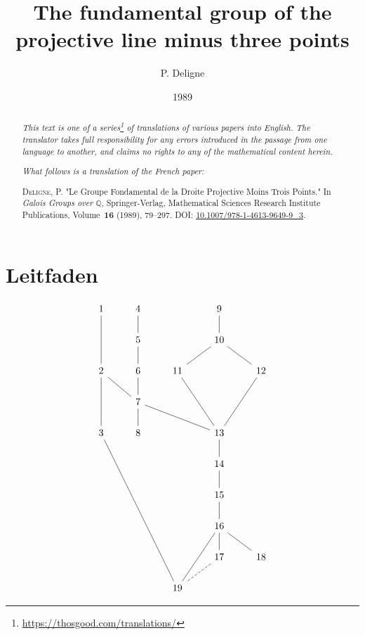 \documentclass{article}
\title{The fundamental group of the projective line minus three points}
\author{P. Deligne}
\date{1989}
\theoremstyle{definition}
\begin{document}
\maketitle
\thispagestyle{fancy}

\renewcommand{\abstractname}{Translator's note.}

\begin{abstract}
  \renewcommand*{\thefootnote}{\fnsymbol{footnote}}
  \emph{This text is one of a series\footnote{\url{https://thosgood.com/translations/}} of translations of various papers into English.}
  \emph{The translator takes full responsibility for any errors introduced in the passage from one language to another, and claims no rights to any of the mathematical content herein.}

  \medskip
  
  \emph{What follows is a translation of the French paper:}

  \medskip\noindent
  \textsc{Deligne, P.}
  "Le Groupe Fondamental de la Droite Projective Moins Trois Points."
  In \emph{Galois Groups over $\mathbb{Q}$}, Springer-Verlag, Mathematical Sciences Research Institute Publications, Volume~\textbf{16} (1989), 79--297.
  \textsc{DOI:} \href{https://doi.org/10.1007/978-1-4613-9649-9_3}{10.1007/978-1-4613-9649-9\_3}.
\end{abstract}

\setcounter{footnote}{0}

\tableofcontents
\bigskip




\section*{Leitfaden}
\[
  \begin{tikzcd}
    1 \ar[dd, no head] & 4 \ar[d, no head] & & 9 \ar[d, no head] &
  \\& 5 \ar[d, no head] & & 10 \ar[dl, no head] \ar[dr, no head] &
  \\2 \ar[dd, no head] \ar[dr, no head] & 6 \ar[d, no head] & 11 \ar[ddr, no head] & & 12 \ar[ddl, no head]
  \\& 7 \ar[d, no head] \ar[drr, no head] & & &
  \\3 \ar[dddddrr, no head] & 8 & & 13 \ar[d, no head] &
  \\ & & & 14 \ar[d, no head] &
  \\ & & & 15 \ar[d, no head] &
  \\ & & & 16 \ar[d, no head] \ar[dr, no head] \ar[ddl, no head] &
  \\ & & & 17 \ar[dl, no head, dashed] & 18
  \\ & & 19 & &
  \end{tikzcd}
\]
\end{document}
